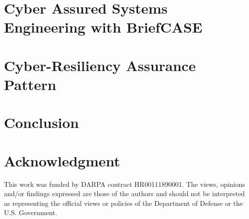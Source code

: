 \documentclass[runningheads]{llncs}
\begin{document}
\section{Cyber Assured Systems Engineering with BriefCASE}
\label{sec:briefcase}


\section{Cyber-Resiliency Assurance Pattern}
\label{sec:assurance-pattern}


\section{Conclusion}
\label{sec:conclusion}


\section{Acknowledgment}

This work was funded by DARPA contract HR00111890001. The views, opinions and/or findings expressed are those of the authors and should not be interpreted as representing the official views or policies of the Department of Defense or the U.S. Government.



\end{document}
